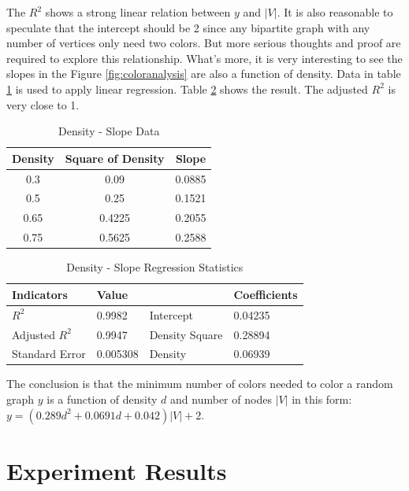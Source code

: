 \documentclass[paper=a4, fontsize=11pt]{scrartcl} %
\numberwithin{equation}{section} %
\numberwithin{figure}{section} %
\numberwithin{table}{section} %
\begin{document}
The $R^{2}$ shows a strong linear relation between $y$ and $|V|$. It is also reasonable to speculate that the intercept should be 2 since any bipartite graph with any number of vertices only need two colors. But more serious thoughts and proof are required to explore this relationship.
What's more, it is very interesting to see the slopes in the Figure \ref{fig:coloranalysis} are also a function of density. Data in table \ref{tab:slope-density} is used to apply linear regression. Table \ref{tab:density-slope} shows the result. The adjusted $R^{2}$ is very close to 1.

\begin{table}[H]
    \centering
    \begin{tabular}{ccc}
    \toprule
        Density & Square of Density & Slope\\
       \midrule
        0.3 & 0.09 &  0.0885\\
        0.5 & 0.25 & 0.1521 \\
        0.65& 0.4225 &0.2055 \\
       0.75 & 0.5625 & 0.2588 \\
      \bottomrule
    \end{tabular}
    \caption{Density - Slope Data}
    \label{tab:slope-density}
\end{table}

\begin{table}[H]
    \centering
    \begin{tabular}{llll}
    \toprule
        Indicators & Value &  & Coefficients\\
       \midrule
        $R^{2}$ & 0.9982 & Intercept &0.04235 \\
        Adjusted $R^{2}$ & 0.9947 & Density Square & 0.28894\\
        Standard Error & 0.005308 & Density & 0.06939\\
      \bottomrule
    \end{tabular}
    \caption{Density - Slope Regression Statistics}
    \label{tab:density-slope}
\end{table}

The conclusion is that the minimum number of colors needed to color a random graph $y$ is a function of density  $d$ and number of nodes $|V|$ in this form: \\
$y = (0.289d^{2}+0.0691d+0.042)|V|+2$.

\section{Experiment Results}\label{sec:data}
\end{document}
